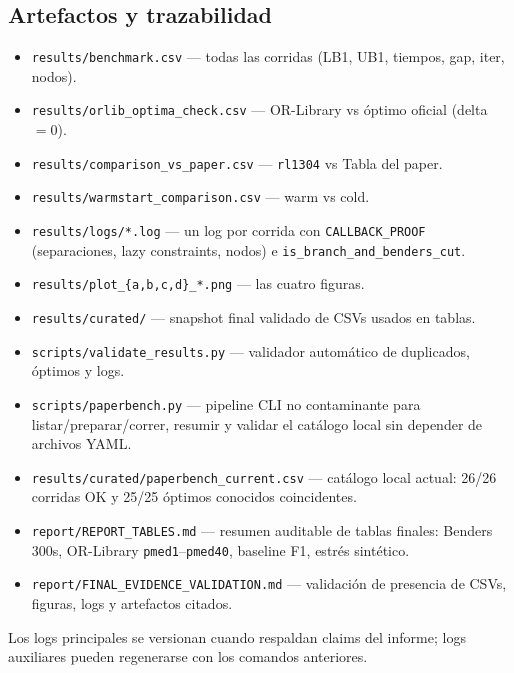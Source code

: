\subsection{Artefactos y trazabilidad}
\begin{itemize}[noitemsep]
  \item \texttt{results/benchmark.csv} — todas las corridas (LB1, UB1, tiempos, gap, iter, nodos).
  \item \texttt{results/orlib\_optima\_check.csv} — OR-Library vs óptimo oficial (delta$=0$).
  \item \texttt{results/comparison\_vs\_paper.csv} — \texttt{rl1304} vs Tabla del paper.
  \item \texttt{results/warmstart\_comparison.csv} — warm vs cold.
  \item \texttt{results/logs/*.log} — un log por corrida con \texttt{CALLBACK\_PROOF} (separaciones,
        lazy constraints, nodos) e \texttt{is\_branch\_and\_benders\_cut}.
  \item \texttt{results/plot\_\{a,b,c,d\}\_*.png} — las cuatro figuras.
  \item \texttt{results/curated/} — snapshot final validado de CSVs usados en tablas.
  \item \texttt{scripts/validate\_results.py} — validador automático de duplicados, óptimos y logs.
  \item \texttt{scripts/paperbench.py} — pipeline CLI no contaminante para listar/preparar/correr,
        resumir y validar el catálogo local sin depender de archivos YAML.
  \item \texttt{results/curated/paperbench\_current.csv} — catálogo local actual: 26/26 corridas
        OK y 25/25 óptimos conocidos coincidentes.
  \item \texttt{report/REPORT\_TABLES.md} — resumen auditable de tablas finales: Benders 300s,
        OR-Library \texttt{pmed1}--\texttt{pmed40}, baseline F1, estrés sintético.
  \item \texttt{report/FINAL\_EVIDENCE\_VALIDATION.md} — validación de presencia de CSVs, figuras,
        logs y artefactos citados.
\end{itemize}
Los logs principales se versionan cuando respaldan claims del informe; logs auxiliares pueden
regenerarse con los comandos anteriores.

